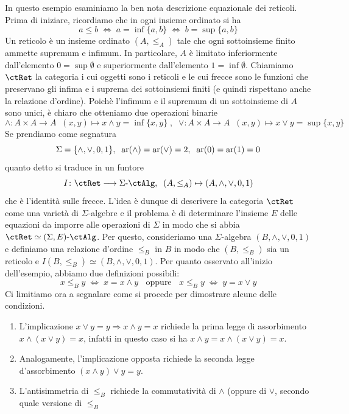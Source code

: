 \begin{example}\label{esempio_Birkhoff_reticoli}
 In questo esempio esaminiamo la ben nota descrizione equazionale dei reticoli. Prima di iniziare, ricordiamo che in ogni insieme
 ordinato si ha
 \[a \leq b \; \Leftrightarrow \; a = \inf\{a,b\} \; \Leftrightarrow \; b = \sup\{a,b\}\]
 Un reticolo è un insieme ordinato \((A,\leq_A)\) tale che ogni sottoinsieme finito ammette supremum e infimum. In particolare,
 \(A\) è limitato inferiormente dall'elemento \(0 = \sup\emptyset\) e superiormente dall'elemento \(1 = \inf\emptyset\). Chiamiamo
 \(\ctRet\) la categoria i cui oggetti sono i reticoli e le cui frecce sono le funzioni che preservano gli infima e i suprema dei sottoinsiemi
 finiti (e quindi rispettano anche la relazione d'ordine). Poichè
 l'infimum e il supremum di un sottoinsieme di \(A\) sono unici, è chiaro che otteniamo due operazioni binarie
 \[\wedge \colon A \times A \to A \;\; (x,y) \mapsto x \wedge y = \inf\{x,y\} \;,\;\;
  \vee \colon A \times A \to A \;\; (x,y) \mapsto x \vee y = \sup\{x,y\}\]
 Se prendiamo come segnatura
 \[\Sigma = \{\wedge, \vee, 0, 1\}, \;\; \text{ar}(\wedge) = \text{ar}(\vee) = 2, \;\; \text{ar}(0) = \text{ar}(1) = 0\]
 quanto detto si traduce in un funtore
 \[I \colon \ctRet \fun \ctSAlg, \;\; (A,\leq_A) \mapsto (A, \wedge, \vee, 0, 1)\]
 che è l'identità sulle frecce. L'idea è dunque di descrivere la categoria \(\ctRet\) come una varietà di \(\Sigma\)-algebre e il
 problema è di determinare l'insieme \(E\) delle equazioni da imporre alle operazioni di \(\Sigma\) in modo che si abbia
 \(\ctRet \simeq \ctSEAlg\). Per questo, consideriamo una \(\Sigma\)-algebra \((B,\wedge,\vee,0,1)\) e definiamo una relazione
 d'ordine \(\leq_B\) in \(B\) in modo che \((B,\leq_B)\) sia un reticolo e \(I(B,\leq_B) \simeq (B,\wedge,\vee,0,1)\). Per quanto
 osservato all'inizio dell'esempio, abbiamo due definizioni possibili:
 \[x \leq_B y \;\Leftrightarrow \; x = x \wedge y \;\; \mbox{ oppure } \;\; x \leq_B y \; \Leftrightarrow \; y = x \vee y\]
 Ci limitiamo ora a segnalare come si procede per dimostrare alcune delle condizioni.
 \begin{enumerate}
  \item[(i)] L'implicazione \(x \vee y = y \Rightarrow x \wedge y = x\) richiede la prima legge di assorbimento \(x \wedge (x \vee y) = x\),
        infatti in questo caso si ha \(x \wedge y = x \wedge (x \vee y) = x\).
  \item[(ii)] Analogamente, l'implicazione opposta richiede la seconda legge d'assorbimento \((x \wedge y) \vee y = y\).
  \item[(iii)] L'antisimmetria di \(\leq_B\) richiede la commutatività di \(\wedge\) (oppure di \(\vee\), secondo quale versione di \(\leq_B\)

\end{enumerate}
\end{example}
